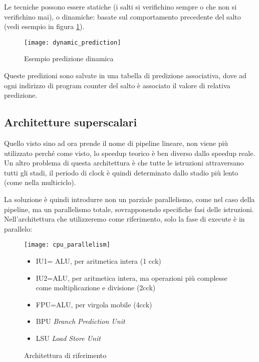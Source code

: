 \documentclass[../template]{subfiles}
\begin{document}
Le tecniche possono essere statiche (i salti si verifichino sempre o che non si verifichino mai), o dinamiche: basate
sul comportamento precedente del salto (vedi esempio in figura \ref{fig:dynamic_prediction}).

\begin{figure}[h]
    \centering
    \texttt{[image: dynamic\_prediction]}
    \caption{Esempio predizione dinamica}
    \label{fig:dynamic_prediction}
\end{figure}

Queste predizioni sono salvate in una tabella di predizione associativa, dove ad ogni indirizzo di program counter del
salto è associato il valore di relativa predizione.

\subsection{Architetture superscalari}
Quello visto sino ad ora prende il nome di pipeline lineare, non viene più utilizzato perché come visto, lo speedup
teorico è ben diverso dallo speedup reale.
Un altro problema di questa architettura è che tutte le istruzioni attraversano tutti gli stadi, il periodo di clock è
quindi determinato dallo stadio più lento (come nella multiciclo).

La soluzione è quindi introdurre non un parziale parallelismo, come nel caso della pipeline, ma un parallelismo totale,
sovrapponendo specifiche fasi delle istruzioni.
Nell'architettura che utilizzeremo come riferimento, solo la fase di execute è in parallelo:

\begin{figure}[h]
    \begin{minipage}{.5\textwidth}
        \centering
        \texttt{[image: cpu\_parallelism]}
    \end{minipage}
    \begin{minipage}{.45\textwidth}
        \begin{itemize}
            \item IU1= ALU, per aritmetica intera (1 cck)
            \item IU2=ALU, per aritmetica intera, ma operazioni più complesse come moltiplicazione e divisione (2cck)
            \item FPU=ALU, per virgola mobile (4cck)
            \item BPU \textit{Branch Prediction Unit}
            \item LSU \textit{Load Store Unit}
        \end{itemize}
    \end{minipage}
    \caption{Architettura di riferimento}
\end{figure}
\end{document}
